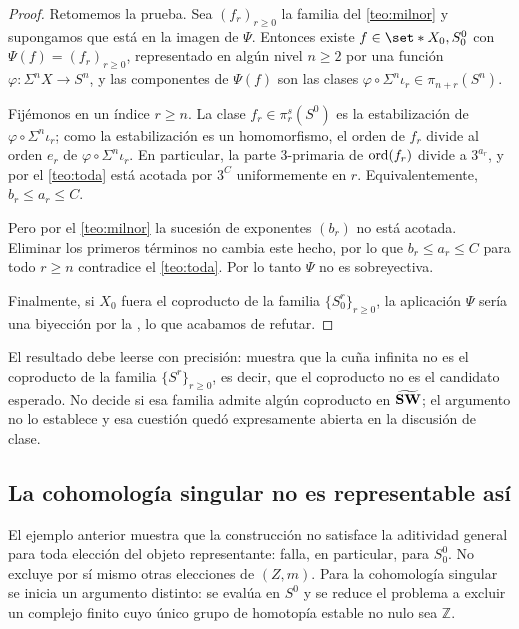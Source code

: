 \begin{proof}
Retomemos la prueba. Sea $(f_r)_{r\ge0}$ la familia del \cref{teo:milnor} y supongamos que está en la imagen de $\Psi$. Entonces existe $f\in\set*{X_0,S^0_0}$ con $\Psi(f)=(f_r)_{r\ge0}$, representado en algún nivel $n\geq2$ por una función $\varphi\colon\Sigma^nX\to S^n$, y las componentes de $\Psi(f)$ son las clases $\varphi\circ\Sigma^n\iota_r\in\pi_{n+r}(S^n)$.

Fijémonos en un índice $r\ge n$. La clase $f_r\in\pi_r^s(S^0)$ es la estabilización de $\varphi\circ\Sigma^n\iota_r$; como la estabilización es un homomorfismo, el orden de $f_r$ divide al orden $e_r$ de $\varphi\circ\Sigma^n\iota_r$. En particular, la parte $3$-primaria de $\operatorname{ord}(f_r)$ divide a $3^{a_r}$, y por el \cref{teo:toda} está acotada por $3^C$ uniformemente en $r$. Equivalentemente, $b_r\le a_r\le C$.

Pero por el \cref{teo:milnor} la sucesión de exponentes $(b_r)$ no está acotada. Eliminar los primeros términos no cambia este hecho, por lo que $b_r\le a_r\le C$ para todo $r\ge n$ contradice el \cref{teo:toda}. Por lo tanto $\Psi$ no es sobreyectiva.

Finalmente, si $X_0$ fuera el coproducto de la familia $\{S^r_0\}_{r\ge0}$, la aplicación $\Psi$ sería una biyección por la , lo que acabamos de refutar.
\end{proof}

\begin{nota}
   El resultado debe leerse con precisión: muestra que la cuña infinita no es el coproducto de la familia $\{S^r\}_{r\ge0}$, es decir, que el coproducto no es el candidato esperado. No decide si esa familia admite algún coproducto en $\widetilde{\mathbf{SW}}$; el argumento no lo establece y esa cuestión quedó expresamente abierta en la discusión de clase.
\end{nota}

\subsection{La cohomología singular no es representable así}

El ejemplo anterior muestra que la construcción no satisface la aditividad general para toda elección del objeto representante: falla, en particular, para $S^0_0$. No excluye por sí mismo otras elecciones de $(Z,m)$. Para la cohomología singular se inicia un argumento distinto: se evalúa en $S^0$ y se reduce el problema a excluir un complejo finito cuyo único grupo de homotopía estable no nulo sea $\mathbb Z$.


